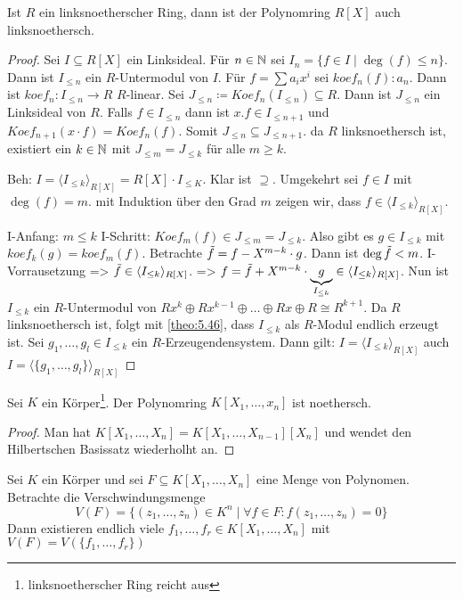 \documentclass[../main.tex]{subfiles}
\begin{document}
\begin{theorem}
    Ist $R$ ein linksnoetherscher Ring, dann ist der Polynomring $R[X]$ auch linksnoethersch.
\end{theorem}
\TODO[Reformatting]
\begin{proof}
    Sei $I\subseteq R[X]$ ein Linksideal.
    Für $n\in \mathbb{N}$ sei $I_n = \{f\in I\mid \deg(f)\leq n\}$.
    Dann ist $I_{\leq n}$ ein $R$-Untermodul von $I$.
    Für $f=\sum a_i x^i$ sei $koef_n(f)\colon a_n$.
    Dann ist $koef_n: I_{\leq n} \rightarrow R$ $R$-linear.
    Sei $J_{\leq n} \coloneqq Koef_n(I_{\leq n}) \subseteq R$.
    Dann ist $J_{\leq n}$ ein Linksideal von $R$.
    Falls $f\in I_{\leq n}$ dann ist $x.f\in I_{\leq n+1}$ und $Koef_{n+1}(x\cdot f) = Koef_n(f)$.
    Somit $J_{\leq n}\subseteq J_{\leq n+1}$.
    da $R$ linksnoethersch ist, existiert ein $k\in \mathbb{N}$ mit $J_{\leq m} = J_{\leq k}$ für alle $m\geq k$.

    Beh: $I = \langle I_{\leq k}\rangle_{R[X]} = R[X]\cdot I_{\leq K}$.
    Klar ist $\supseteq$.
    Umgekehrt sei $f\in I$ mit $\deg(f)=m$.
    mit Induktion über den Grad $m$ zeigen wir, dass $f\in \langle I_{\leq k}\rangle_{R[X]}$.

    I-Anfang: $m\leq k$ \checkmark
    I-Schritt: $Koef_m(f)\in J_{\leq m} = J_{\leq k}$.
    Also gibt es $g\in I_{\leq k}$ mit $koef_k(g)=koef_m(f)$.
    Betrachte $\Tilde{f} = f- X^{m-k}\cdot g$.
    Dann ist $\deg \Tilde{f}  < m$.
    I-Vorrausetzung => $\Tilde{f}\in \langle I_{\leq k} \rangle_{R[X]}$.
    => $f = \Tilde{f} + X^{m-k} \cdot \underbrace{g}_{I_{\leq k}} \in \langle I_{\leq k}\rangle_{R[X]}$.
    Nun ist $I_{\leq k}$ ein $R$-Untermodul von $R x^k \oplus Rx^{k-1}\oplus \dots \oplus Rx \oplus R\cong R^{k+1}$.
    Da $R$ linksnoethersch ist, folgt mit \ref{theo:5.46}, dass $I_{\leq k}$ als $R$-Modul endlich erzeugt ist.
    Sei $g_1,\dots, g_l\in I_{\leq k}$ ein $R$-Erzeugendensystem.
    Dann gilt: $I=\langle I_{\leq k}\rangle_{R[X]}$ auch $I = \langle\{g_1,\dots,g_l\}\rangle_{R[X]}$
\end{proof}

\begin{corollary}
    Sei $K$ ein Körper\footnote{linksnoetherscher Ring reicht aus}. Der Polynomring $K[X_1,\dots,x_n]$ ist noethersch.
\end{corollary}
\begin{proof}
    Man hat $K[X_1,\dots,X_n] = K[X_1,\dots,X_{n-1}][X_n]$ und wendet den Hilbertschen Basissatz  wiederholht an.
\end{proof}
\begin{corollary} %
    Sei $K$ ein Körper und sei $F\subseteq K[X_1, \dots, X_n]$ eine Menge von Polynomen. Betrachte die Verschwindungsmenge $$V(F) = \{(z_1,\dots,z_n)\in K^n\mid \forall f\in F: f(z_1,\dots,z_n) = 0\}$$
    Dann existieren endlich viele $f_1,\dots,f_r\in K[X_1,\dots,X_n]$ mit $V(F) = V(\{f_1,\dots, f_r\})$
\end{corollary}
\end{document}
